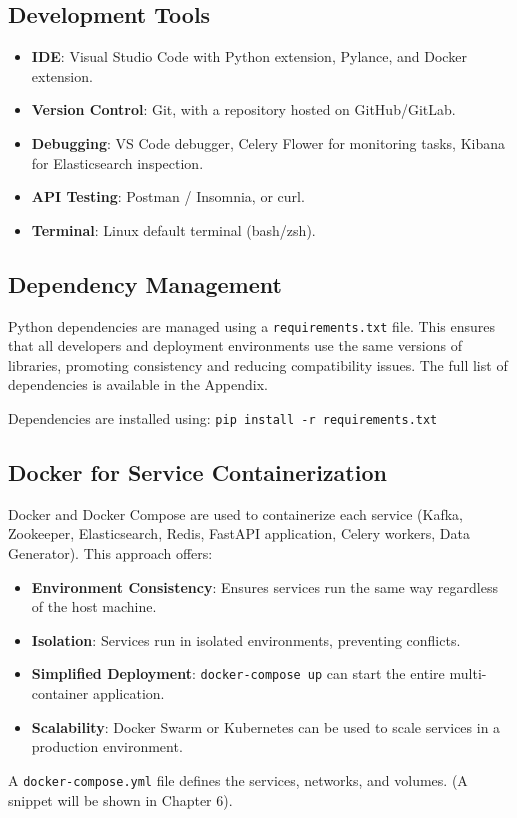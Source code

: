\subsection{Development Tools}
\begin{itemize}
    \item \textbf{IDE}: Visual Studio Code with Python extension, Pylance, and Docker extension.
    \item \textbf{Version Control}: Git, with a repository hosted on GitHub/GitLab.
    \item \textbf{Debugging}: VS Code debugger, Celery Flower for monitoring tasks, Kibana for Elasticsearch inspection.
    \item \textbf{API Testing}: Postman / Insomnia, or curl.
    \item \textbf{Terminal}: Linux default terminal (bash/zsh).
\end{itemize}

\subsection{Dependency Management}

Python dependencies are managed using a \texttt{requirements.txt} file. This ensures that all developers and deployment environments use the same versions of libraries, promoting consistency and reducing compatibility issues. The full list of dependencies is available in the Appendix.

Dependencies are installed using: \texttt{pip install -r requirements.txt}

\subsection{Docker for Service Containerization}

Docker and Docker Compose are used to containerize each service (Kafka, Zookeeper, Elasticsearch, Redis, FastAPI application, Celery workers, Data Generator). This approach offers:
\begin{itemize}
    \item \textbf{Environment Consistency}: Ensures services run the same way regardless of the host machine.
    \item \textbf{Isolation}: Services run in isolated environments, preventing conflicts.
    \item \textbf{Simplified Deployment}: \texttt{docker-compose up} can start the entire multi-container application.
    \item \textbf{Scalability}: Docker Swarm or Kubernetes can be used to scale services in a production environment.
\end{itemize}
A \texttt{docker-compose.yml} file defines the services, networks, and volumes. (A snippet will be shown in Chapter 6).

